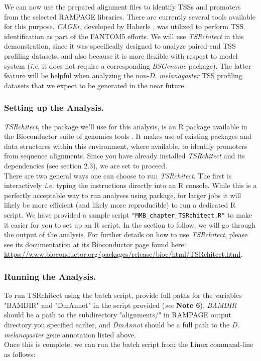 \documentclass[runningheads,a4paper]{llncs}
\begin{document}
\begin{linenumbers}
We can now use the prepared alignment files to identify TSSs and promoters from the selected RAMPAGE libraries.
There are currently several tools available for this purpose.
\textit{CAGEr}, developed by Haberle \cite{Haberle:2015fp}, was utilized to perform TSS identification as part of the FANTOM5 efforts.
We will use \textit{TSRchitect} in this demonstration, since it was specifically designed to analyze paired-end TSS profiling datasets, and also because it is more flexible with respect to model system (\textit{i.e.} it does not require a corresponding \textit{BSGenome} package).
The latter feature will be helpful when analyzing the non-\textit{D. melanagaster} TSS profiling datasets that we expect to be generated in the near future.

\subsubsection{Setting up the Analysis.}
\textit{TSRchitect}, the package we'll use for this analysis, is an R package available in the Bioconductor suite of genomics tools \cite{Lawrence:2014gy}.
It makes use of existing packages and data structures within this environment, where available, to identify promoters from sequence alignments.
Since you have already installed \textit{TSRchitect} and its dependencies (see section 2.3), we are set to proceed.\\
There are two general ways one can choose to run \textit{TSRchitect}. 
The first is interactively \textit{i.e.} typing the instructions directly into an R console.
While this is a perfectly acceptable way to run analyses using package, for larger jobs it will likely be more efficient (and likely more reproducible) to run a dedicated R script.
We have provided a sample script \texttt{"MMB\_chapter\_TSRchitect.R"} to make it easier for you to set up an R script. 
In the section to follow, we will go through the output of the analysis. 
For further details on how to use \textit{TSRchitect}, please see its documentation at its Bioconductor page found here: \url{https://www.bioconductor.org/packages/release/bioc/html/TSRchitect.html}.\\

\subsubsection{Running the Analysis.}
To run TSRchitect using the batch script, provide full paths for the variables "BAMDIR" and "DmAnnot" in the script provided (\textit{see} \textbf{Note 6}).
\textit{BAMDIR} should be a path to the subdirectory "alignments/" in RAMPAGE output directory you specified earlier, and \textit{DmAnnot} should be a full path to the \textit{D. melanogaster} gene annotation listed above.
\\
Once this is complete, we can run the batch script from the Linux command-line as follows:


\end{linenumbers}
\end{document}
